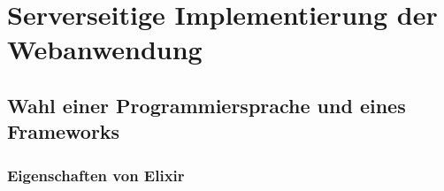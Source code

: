 \chapter{Serverseitige Implementierung der Webanwendung}

\section{Wahl einer Programmiersprache und eines Frameworks}

\subsection{Eigenschaften von Elixir}
